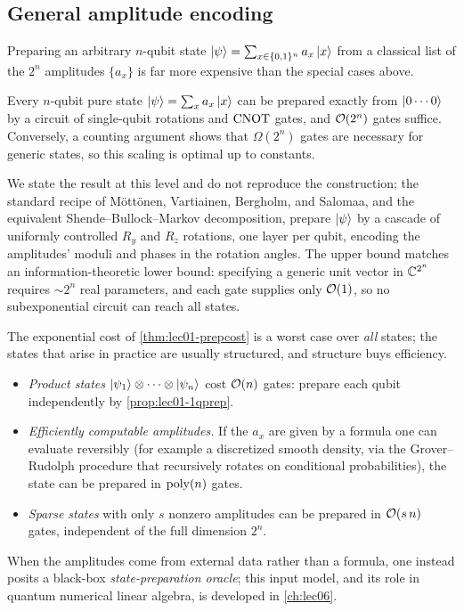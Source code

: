 \subsection{General amplitude encoding}

Preparing an arbitrary $n$-qubit state $\ket{\psi}=\sum_{x\in\{0,1\}^{n}}a_{x}\ket{x}$
from a classical list of the $2^{n}$ amplitudes $\{a_{x}\}$ is far more expensive than
the special cases above.

\begin{theorem}\label{thm:lec01-prepcost}
Every $n$-qubit pure state $\ket{\psi}=\sum_{x}a_{x}\ket{x}$ can be prepared exactly
from $\ket{0\cdots0}$ by a circuit of single-qubit rotations and $\mathrm{CNOT}$ gates, and
$\mathcal{O}(2^{n})$ gates suffice. Conversely, a counting argument shows that
$\Omega(2^{n})$ gates are necessary for generic states, so this scaling is optimal up
to constants.
\end{theorem}

We state the result at this level and do not reproduce the construction; the standard
recipe of Möttönen, Vartiainen, Bergholm, and Salomaa, and the equivalent
Shende--Bullock--Markov decomposition, prepare $\ket{\psi}$ by a cascade of
uniformly controlled $R_{y}$ and $R_{z}$ rotations, one layer per qubit, encoding the
amplitudes' moduli and phases in the rotation angles. The upper bound matches an
information-theoretic lower bound: specifying a generic unit vector in $\mathbb{C}^{2^{n}}$
requires $\sim 2^{n}$ real parameters, and each gate supplies only $\mathcal{O}(1)$, so no
subexponential circuit can reach all states.

\begin{remark}\label{rem:lec01-prepefficient}
The exponential cost of \cref{thm:lec01-prepcost} is a worst case over \emph{all}
states; the states that arise in practice are usually structured, and structure buys
efficiency.
\begin{itemize}[nosep]
  \item \emph{Product states} $\ket{\psi_{1}}\otimes\cdots\otimes\ket{\psi_{n}}$ cost
        $\mathcal{O}(n)$ gates: prepare each qubit independently by \cref{prop:lec01-1qprep}.
  \item \emph{Efficiently computable amplitudes.} If the $a_{x}$ are given by a
        formula one can evaluate reversibly (for example a discretized smooth density,
        via the Grover--Rudolph procedure that recursively rotates on conditional
        probabilities), the state can be prepared in $\operatorname{poly}(n)$ gates.
  \item \emph{Sparse states} with only $s$ nonzero amplitudes can be prepared in
        $\mathcal{O}(s\,n)$ gates, independent of the full dimension $2^{n}$.
\end{itemize}
When the amplitudes come from external data rather than a formula, one instead posits
a black-box \emph{state-preparation oracle}; this input model, and its role in
quantum numerical linear algebra, is developed in \cref{ch:lec06}.
\end{remark}

